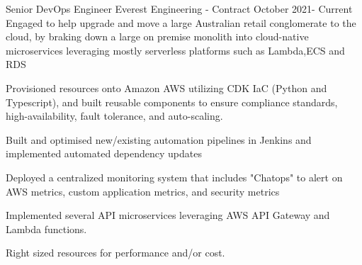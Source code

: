 
\begin{cventries}

  \cventryextended
  {Senior DevOps Engineer} %
  {Everest Engineering - Contract} %
  {} %
  {October 2021- Current} %
  {Engaged to help upgrade and move a large Australian retail conglomerate to
    the cloud, by braking down a large on premise monolith into cloud-native
    microservices leveraging mostly serverless platforms such as Lambda,ECS and
    RDS}
  {
    \begin{cvitems} %
      \item {Provisioned resources onto Amazon AWS utilizing CDK IaC (Python
                  and Typescript), and built reusable components to ensure
                  compliance standards,
                  high-availability, fault tolerance, and auto-scaling.}
      \item {Built and optimised new/existing automation pipelines in Jenkins
                  and implemented automated dependency updates}
      \item {Deployed a centralized monitoring system that includes "Chatops"
                  to alert on AWS metrics, custom application metrics, and
                  security metrics }
      \item {Implemented several API microservices leveraging AWS API Gateway
                  and Lambda functions.}
      \item {Right sized resources for performance and/or cost.}
    \end{cvitems}
  }


\end{cventries}
